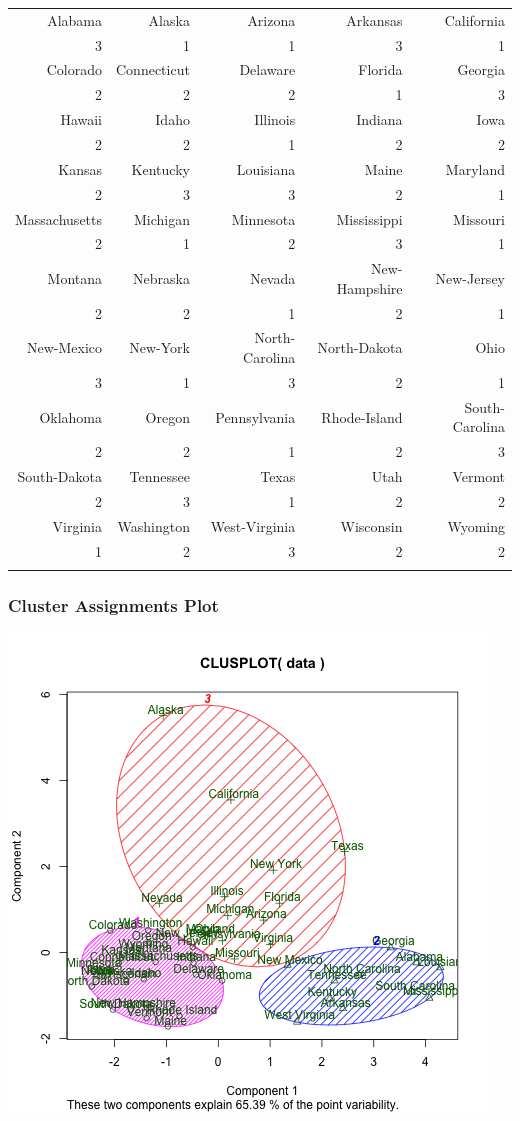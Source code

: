\documentclass[11pt]{article}
\begin{document}
\begin{center}
\begin{tabular}{rrrrr}
Alabama & Alaska & Arizona & Arkansas & California\\
3 & 1 & 1 & 3 & 1\\
Colorado & Connecticut & Delaware & Florida & Georgia\\
2 & 2 & 2 & 1 & 3\\
Hawaii & Idaho & Illinois & Indiana & Iowa\\
2 & 2 & 1 & 2 & 2\\
Kansas & Kentucky & Louisiana & Maine & Maryland\\
2 & 3 & 3 & 2 & 1\\
Massachusetts & Michigan & Minnesota & Mississippi & Missouri\\
2 & 1 & 2 & 3 & 1\\
Montana & Nebraska & Nevada & New-Hampshire & New-Jersey\\
2 & 2 & 1 & 2 & 1\\
New-Mexico & New-York & North-Carolina & North-Dakota & Ohio\\
3 & 1 & 3 & 2 & 1\\
Oklahoma & Oregon & Pennsylvania & Rhode-Island & South-Carolina\\
2 & 2 & 1 & 2 & 3\\
South-Dakota & Tennessee & Texas & Utah & Vermont\\
2 & 3 & 1 & 2 & 2\\
Virginia & Washington & West-Virginia & Wisconsin & Wyoming\\
1 & 2 & 3 & 2 & 2\\
 &  &  &  & \\
\end{tabular}
\end{center}
\subsubsection*{Cluster Assignments Plot}
\label{sec:org383097d}
\begin{center}
\includegraphics[width=.9\linewidth]{k-3-clusters.png}
\end{center}
\end{document}
